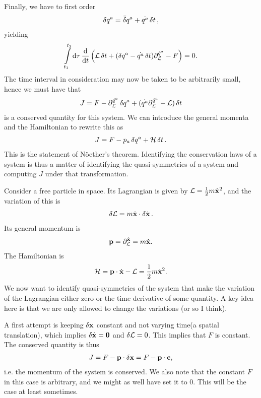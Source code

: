 Finally, we have to first order
\begin{align*}
	\var{q^{a}} = \bar{\delta}q^{a} + \dot{q^{a}}\var{t},
\end{align*}
yielding
\begin{align*}
	\int\limits_{t_{1}}^{t_{2}}\dd{\tau}{\dv{t}\left(\ensuremath{\mathcal{L}}\var{t} + (\var{q^{a}} - \dot{q^{a}}\var{t})\ensuremath{\partial^{\dot{q}^{a}}_{\mathcal{L}}} - F\right)} = 0.
\end{align*}
The time interval in consideration may now be taken to be arbitrarily small, hence we must have that
\begin{align*}
	J = F - \partial^{\dot{q}^{a}}_{\mathcal{L}}\var{q^{a}} + (\dot{q^{a}}\partial^{\dot{q}^{a}}_{\mathcal{L}} - \mathcal{L})\var{t}
\end{align*}
is a conserved quantity for this system. We can introduce the general momenta and the Hamiltonian to rewrite this as
\begin{align*}
	J = F - p_{a}\var{q^{a}} + \mathcal{H}\var{t}.
\end{align*}
This is the statement of Nöether's theorem. Identifying the conservation laws of a system is thus a matter of identifying the quasi-symmetries of a system and computing $J$ under that transformation.

Consider a free particle in space. Its Lagrangian is given by $\mathcal{L} = \frac{1}{2}m\dot{\vb{x}}^{2}$, and the variation of this is
\begin{align*}
\var{\ensuremath{\mathcal{L}}} = m\dot{\vb{x}}\cdot\var{\dot{\vb{x}}}.
\end{align*}
Its general momentum is
\begin{align*}
\vb{p} = \partial^{\dot{\vb{x}}}_{\mathcal{L}} = m\dot{\vb{x}}.
\end{align*}
The Hamiltonian is
\begin{align*}
\mathcal{H} = \vb{p}\cdot\dot{\vb{x}} - \mathcal{L} = \frac{1}{2}m\dot{\vb{x}}^{2}.
\end{align*}
We now want to identify quasi-symmetries of the system that make the variation of the Lagrangian either zero or the time derivative of some quantity. A key idea here is that we are only allowed to change the variations (or so I think).

A first attempt is keeping $\var{\vb{x}}$ constant and not varying time(a spatial translation), which implies $\var{\dot{\vb{x}}} = \vb{0}$ and $\var{\ensuremath{\mathcal{L}}} = 0$. This implies that $F$ is constant. The conserved quantity is thus
\begin{align*}
J = F - \vb{p}\cdot\var{\vb{x}} = F - \vb{p}\cdot\vb{c},
\end{align*}
i.e. the momentum of the system is conserved. We also note that the constant $F$ in this case is arbitrary, and we might as well have set it to $0$. This will be the case at least sometimes.

